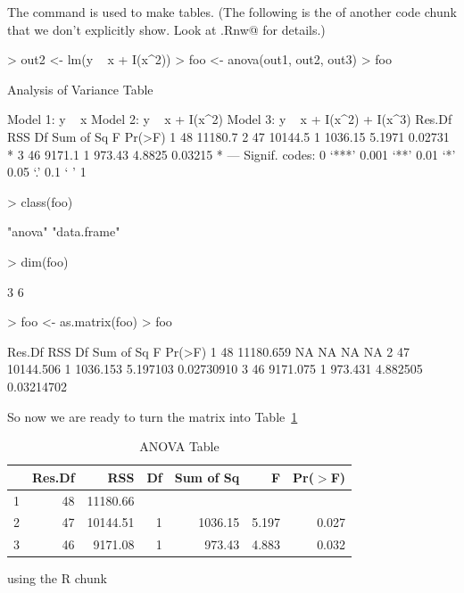 \documentclass{article}
\begin{document}
The \verb@xtable@ command is used to make tables.  (The following
is the \verb@Sweave@ of another code chunk that we don't explicitly
show.  Look at \verb@foo.Rnw@ for details.)
\begin{Schunk}
\begin{Sinput}
> out2 <- lm(y ~ x + I(x^2))
> foo <- anova(out1, out2, out3)
> foo
\end{Sinput}
\begin{Soutput}
Analysis of Variance Table

Model 1: y ~ x
Model 2: y ~ x + I(x^2)
Model 3: y ~ x + I(x^2) + I(x^3)
  Res.Df     RSS Df Sum of Sq      F  Pr(>F)  
1     48 11180.7                              
2     47 10144.5  1   1036.15 5.1971 0.02731 *
3     46  9171.1  1    973.43 4.8825 0.03215 *
---
Signif. codes:  0 ‘***’ 0.001 ‘**’ 0.01 ‘*’ 0.05 ‘.’ 0.1 ‘ ’ 1
\end{Soutput}
\begin{Sinput}
> class(foo)
\end{Sinput}
\begin{Soutput}
[1] "anova"      "data.frame"
\end{Soutput}
\begin{Sinput}
> dim(foo)
\end{Sinput}
\begin{Soutput}
[1] 3 6
\end{Soutput}
\begin{Sinput}
> foo <- as.matrix(foo)
> foo
\end{Sinput}
\begin{Soutput}
  Res.Df       RSS Df Sum of Sq        F     Pr(>F)
1     48 11180.659 NA        NA       NA         NA
2     47 10144.506  1  1036.153 5.197103 0.02730910
3     46  9171.075  1   973.431 4.882505 0.03214702
\end{Soutput}
\end{Schunk}
So now we are ready to turn the matrix \verb@foo@
into Table~\ref{tab:one}
\begin{table}[tbp]
\centering
\caption{ANOVA Table} 
\label{tab:one}
\begin{tabular}{rrrrrrr}
  \hline
 & Res.Df & RSS & Df & Sum of Sq & F & Pr($>$F) \\ 
  \hline
1 & 48 & 11180.66 &  &  &  &  \\ 
  2 & 47 & 10144.51 & 1 & 1036.15 & 5.197 & 0.027 \\ 
  3 & 46 & 9171.08 & 1 & 973.43 & 4.883 & 0.032 \\ 
   \hline
\end{tabular}
\end{table}using the R chunk
\end{document}
